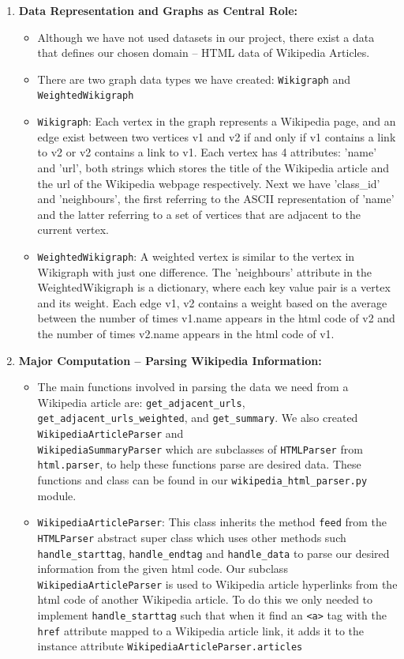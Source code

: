 \documentclass[fontsize=11pt]{article}
\begin{document}
\begin{enumerate}
    \item \textbf{Data Representation and Graphs as Central Role:}
    \begin{itemize}
        \item Although we have not used datasets in our project, there exist a data that defines our chosen domain – HTML data of Wikipedia Articles.
        \item There are two graph data types we have created: \texttt{Wikigraph} and \texttt{WeightedWikigraph}
        \item \texttt{Wikigraph}: Each vertex in the graph represents a Wikipedia page, and an edge exist between two vertices v1 and v2 if and only if v1 contains a link to v2 or v2 contains a link to v1. Each vertex has 4 attributes: 'name' and 'url', both strings which stores the title of the Wikipedia article and the url of the Wikipedia webpage respectively. Next we have 'class\_id' and 'neighbours', the first referring to the ASCII representation of 'name' and the latter referring to a set of vertices that are adjacent to the current vertex.
        \item \texttt{WeightedWikigraph}: A weighted vertex is similar to the vertex in Wikigraph with just one difference. The 'neighbours' attribute in the WeightedWikigraph is a dictionary, where each key value pair is a vertex and its weight. Each edge {v1, v2} contains a weight based on the average between the number of times v1.name appears in the html code of v2 and the number of times v2.name appears in the html code of v1.
    \end{itemize}
    \item \textbf{Major Computation – Parsing Wikipedia Information:}
    \begin{itemize}
        \item The main functions involved in parsing the data we need from a Wikipedia article are: \texttt{get\_adjacent\_urls}, \texttt{get\_adjacent\_urls\_weighted}, and \texttt{get\_summary}. We also created \texttt{WikipediaArticleParser} and \\ \texttt{WikipediaSummaryParser} which are subclasses of \texttt{HTMLParser} from \texttt{html.parser}, to help these functions parse are desired data. These functions and class can be found in our \texttt{wikipedia\_html\_parser.py} module.
        \item \texttt{WikipediaArticleParser}: This class inherits the method \texttt{feed} from the \texttt{HTMLParser} abstract super class which uses other methods such \texttt{handle\_starttag}, \texttt{handle\_endtag} and \texttt{handle\_data} to parse our desired information from the given html code. Our subclass \texttt{WikipediaArticleParser} is used to Wikipedia article hyperlinks from the html code of another Wikipedia article. To do this we only needed to implement \texttt{handle\_starttag} such that when it find an \texttt{<a>} tag with the \texttt{href} attribute mapped to a Wikipedia article link, it adds it to the instance attribute \texttt{WikipediaArticleParser.articles}

\end{itemize}
\end{enumerate}
\end{document}
